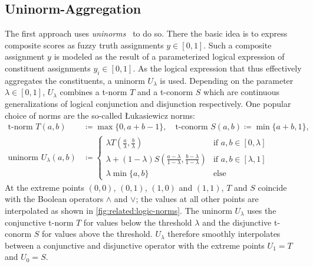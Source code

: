 \subsection{Uninorm-Aggregation}%
\label{sec:related:lta:uninorm}

The first approach uses \textit{uninorms}~\cite{Melnikov2016} to do so.
There the basic idea is to express composite scores as fuzzy truth assignments $y \in [0, 1]$.
Such a composite assignment $y$ is modeled as the result of a parameterized logical expression of constituent assignments $y_i \in [0, 1]$.
As the logical expression that thus effectively aggregates the constituents, a uninorm $U_{\lambda}$ is used.
Depending on the parameter $\lambda \in [0, 1]$, $U_{\lambda}$ combines a t-norm $T$ and a t-conorm $S$ which are continuous generalizations of logical conjunction and disjunction respectively.
One popular choice of norms are the so-called Łukasiewicz norms:
\begin{align}
	\text{t-norm } T(a, b) &\coloneqq \max \{ 0, a + b - 1 \}, \quad\text{t-conorm } S(a, b) \coloneqq \min \{ a + b, 1 \}, \nonumber \\
	\text{uninorm } U_\lambda(a, b) &\coloneqq \begin{cases}
		\lambda T\left(\frac{a}{\lambda}, \frac{b}{\lambda}\right) & \text{if } a, b \in [0, \lambda] \\
		\lambda + (1 - \lambda) S\left(\frac{a - \lambda}{1 - \lambda}, \frac{b - \lambda}{1 - \lambda}\right) & \text{if } a, b \in [\lambda, 1] \\
		\lambda \min \{ a, b \} & \text{else}
	\end{cases}
\end{align}
At the extreme points $(0, 0)$, $(0, 1)$, $(1, 0)$ and $(1, 1)$, $T$ and $S$ coincide with the Boolean operators $\land$ and $\lor$;
the values at all other points are interpolated as shown in \cref{fig:related:logic-norms}.
The uninorm $U_\lambda$ uses the conjunctive t-norm $T$ for values below the threshold $\lambda$ and the disjunctive t-conorm $S$ for values above the threshold.
$U_\lambda$ therefore smoothly interpolates between a conjunctive and disjunctive operator with the extreme points $U_1 = T$ and $U_0 = S$.
